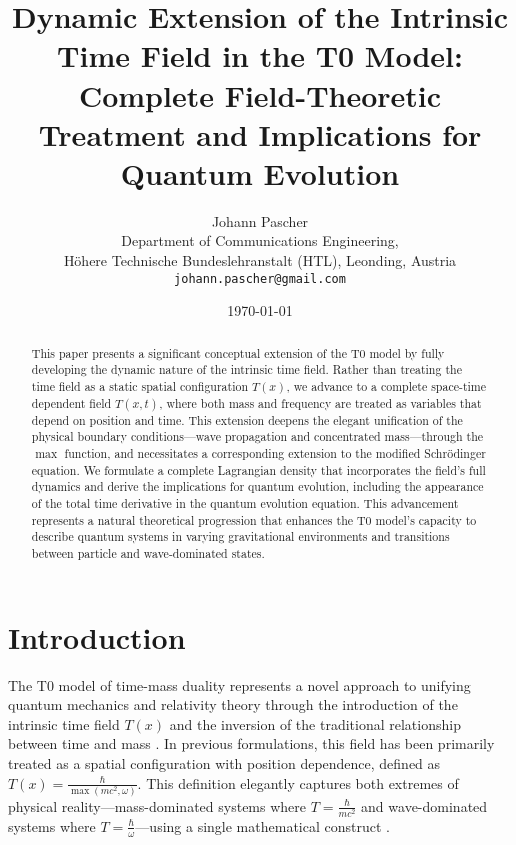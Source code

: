 \documentclass[12pt,a4paper]{article}
\newcommand{\Tfield}{T(x)}
\newcommand{\Tfieldt}{T(x,t)}
\begin{document}
	
	\title{Dynamic Extension of the Intrinsic Time Field in the T0 Model: \\Complete Field-Theoretic Treatment and Implications for Quantum Evolution}
	\author{Johann Pascher\\
		Department of Communications Engineering, \\Höhere Technische Bundeslehranstalt (HTL), Leonding, Austria\\
		\texttt{johann.pascher@gmail.com}}
	\date{\today}
	
	\maketitle
	
	\begin{abstract}
		This paper presents a significant conceptual extension of the T0 model by fully developing the dynamic nature of the intrinsic time field. Rather than treating the time field as a static spatial configuration $\Tfield$, we advance to a complete space-time dependent field $\Tfieldt$, where both mass and frequency are treated as variables that depend on position and time. This extension deepens the elegant unification of the physical boundary conditions—wave propagation and concentrated mass—through the $\max$ function, and necessitates a corresponding extension to the modified Schrödinger equation. We formulate a complete Lagrangian density that incorporates the field's full dynamics and derive the implications for quantum evolution, including the appearance of the total time derivative in the quantum evolution equation. This advancement represents a natural theoretical progression that enhances the T0 model's capacity to describe quantum systems in varying gravitational environments and transitions between particle and wave-dominated states.
	\end{abstract}
	\newpage
	\tableofcontents
	\newpage
	\section{Introduction}
	\label{sec:introduction}
	
	The T0 model of time-mass duality represents a novel approach to unifying quantum mechanics and relativity theory through the introduction of the intrinsic time field $\Tfield$ and the inversion of the traditional relationship between time and mass \cite{pascher_part1_2025,pascher_part2_2025}. In previous formulations, this field has been primarily treated as a spatial configuration with position dependence, defined as $\Tfield = \frac{\hbar}{\max(mc^2, \omega)}$. This definition elegantly captures both extremes of physical reality—mass-dominated systems where $T = \frac{\hbar}{mc^2}$ and wave-dominated systems where $T = \frac{\hbar}{\omega}$—using a single mathematical construct \cite{pascher_quantum_2025}.
	
\end{document}
